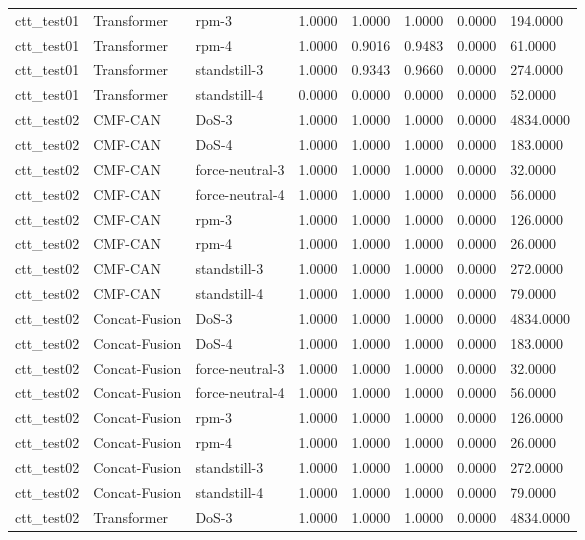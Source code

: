 \begin{tabular}{llllllll}
ctt_test01 & Transformer & rpm-3 & 1.0000 & 1.0000 & 1.0000 & 0.0000 & 194.0000 \\
ctt_test01 & Transformer & rpm-4 & 1.0000 & 0.9016 & 0.9483 & 0.0000 & 61.0000 \\
ctt_test01 & Transformer & standstill-3 & 1.0000 & 0.9343 & 0.9660 & 0.0000 & 274.0000 \\
ctt_test01 & Transformer & standstill-4 & 0.0000 & 0.0000 & 0.0000 & 0.0000 & 52.0000 \\
ctt_test02 & CMF-CAN & DoS-3 & 1.0000 & 1.0000 & 1.0000 & 0.0000 & 4834.0000 \\
ctt_test02 & CMF-CAN & DoS-4 & 1.0000 & 1.0000 & 1.0000 & 0.0000 & 183.0000 \\
ctt_test02 & CMF-CAN & force-neutral-3 & 1.0000 & 1.0000 & 1.0000 & 0.0000 & 32.0000 \\
ctt_test02 & CMF-CAN & force-neutral-4 & 1.0000 & 1.0000 & 1.0000 & 0.0000 & 56.0000 \\
ctt_test02 & CMF-CAN & rpm-3 & 1.0000 & 1.0000 & 1.0000 & 0.0000 & 126.0000 \\
ctt_test02 & CMF-CAN & rpm-4 & 1.0000 & 1.0000 & 1.0000 & 0.0000 & 26.0000 \\
ctt_test02 & CMF-CAN & standstill-3 & 1.0000 & 1.0000 & 1.0000 & 0.0000 & 272.0000 \\
ctt_test02 & CMF-CAN & standstill-4 & 1.0000 & 1.0000 & 1.0000 & 0.0000 & 79.0000 \\
ctt_test02 & Concat-Fusion & DoS-3 & 1.0000 & 1.0000 & 1.0000 & 0.0000 & 4834.0000 \\
ctt_test02 & Concat-Fusion & DoS-4 & 1.0000 & 1.0000 & 1.0000 & 0.0000 & 183.0000 \\
ctt_test02 & Concat-Fusion & force-neutral-3 & 1.0000 & 1.0000 & 1.0000 & 0.0000 & 32.0000 \\
ctt_test02 & Concat-Fusion & force-neutral-4 & 1.0000 & 1.0000 & 1.0000 & 0.0000 & 56.0000 \\
ctt_test02 & Concat-Fusion & rpm-3 & 1.0000 & 1.0000 & 1.0000 & 0.0000 & 126.0000 \\
ctt_test02 & Concat-Fusion & rpm-4 & 1.0000 & 1.0000 & 1.0000 & 0.0000 & 26.0000 \\
ctt_test02 & Concat-Fusion & standstill-3 & 1.0000 & 1.0000 & 1.0000 & 0.0000 & 272.0000 \\
ctt_test02 & Concat-Fusion & standstill-4 & 1.0000 & 1.0000 & 1.0000 & 0.0000 & 79.0000 \\
ctt_test02 & Transformer & DoS-3 & 1.0000 & 1.0000 & 1.0000 & 0.0000 & 4834.0000 \\

\end{tabular}
